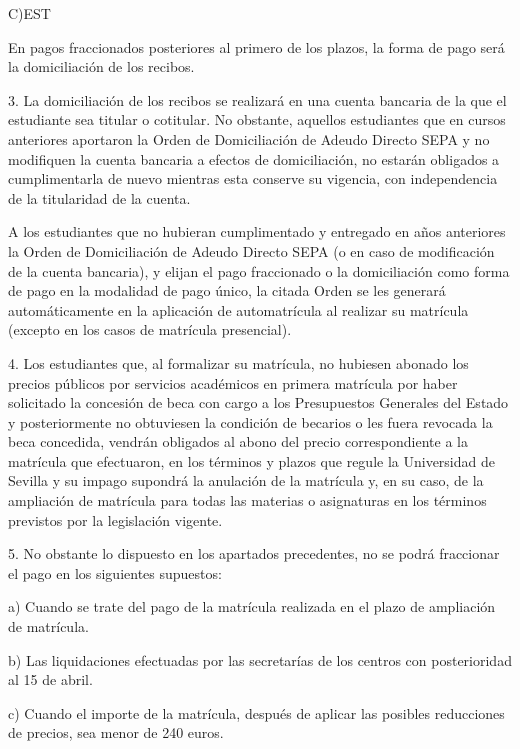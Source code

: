 \documentclass{article}
\begin{document}
\begin{itemize}
\begin{itemize}
\begin{scriptsize}
                  C)EST

                  En pagos fraccionados posteriores al primero de los plazos, la forma de pago será la domiciliación de los recibos.

                  3. La domiciliación de los recibos se realizará en una cuenta bancaria de la que el estudiante sea titular o cotitular. No obstante, aquellos estudiantes que en cursos anteriores aportaron la Orden de Domiciliación de Adeudo Directo SEPA y no modifiquen la cuenta bancaria a efectos de domiciliación, no estarán obligados a cumplimentarla de nuevo mientras esta conserve su vigencia, con independencia de la titularidad de la cuenta.

                  A los estudiantes que no hubieran cumplimentado y entregado en años anteriores la Orden de Domiciliación de Adeudo Directo SEPA (o en caso de modificación de la cuenta bancaria), y elijan el pago fraccionado o la domiciliación como forma de pago en la modalidad de pago único, la citada Orden se les generará automáticamente en la aplicación de automatrícula al realizar su matrícula (excepto en los casos de matrícula presencial).

                  4. Los estudiantes que, al formalizar su matrícula, no hubiesen abonado los precios públicos por servicios académicos en primera matrícula por haber solicitado la concesión de beca con cargo a los Presupuestos Generales del Estado y posteriormente no obtuviesen la condición de becarios o les fuera revocada la beca concedida, vendrán obligados al abono del precio correspondiente a la matrícula que efectuaron, en los términos y plazos que regule la Universidad de Sevilla y su impago supondrá la anulación de la matrícula y, en su caso, de la ampliación de matrícula para todas las materias o asignaturas en los términos previstos por la legislación vigente.

                  5. No obstante lo dispuesto en los apartados precedentes, no se podrá fraccionar el pago en los siguientes supuestos:

                  a) Cuando se trate del pago de la matrícula realizada en el plazo de ampliación de matrícula.

                  b) Las liquidaciones efectuadas por las secretarías de los centros con posterioridad al 15 de abril.

                  c) Cuando el importe de la matrícula, después de aplicar las posibles reducciones de precios, sea menor de 240 euros.


\end{scriptsize}
\end{itemize}
\end{itemize}
\end{document}
